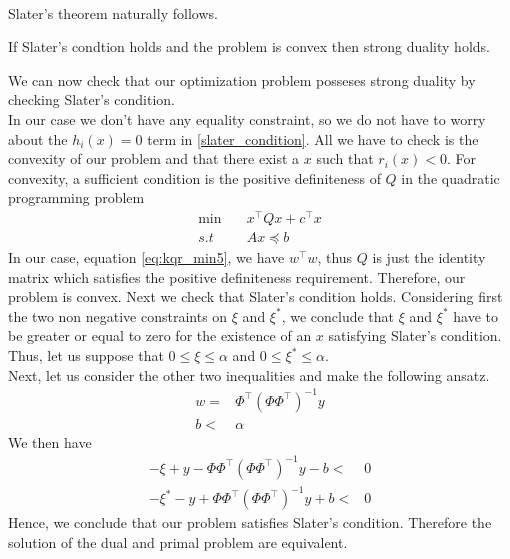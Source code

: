 \\
Slater's theorem naturally follows.
\begin{theorem}
    If Slater's condtion holds and the problem is convex then strong duality holds.
\end{theorem}
We can now check that our optimization problem posseses strong duality by checking Slater's condition.
\\
In our case we don't have any equality constraint, so we do not have to worry about the $h_i(x)=0$ term in \ref{slater_condition}. All we have to check is the convexity of our problem and that there exist a $x$ such that $r_i(x)<0$.
For convexity, a sufficient condition is the positive definiteness of $Q$ in the quadratic programming problem 
\begin{equation}
    \begin{aligned}
        \min \quad & x^\intercal Q x+ c^\intercal x \\        
        s.t \quad& Ax\preceq b
    \end{aligned}
\end{equation}
In our case, equation \ref{eq:kqr_min5}, we have $w^\intercal w$, thus $Q$ is just the identity matrix which satisfies the positive definiteness requirement. Therefore, our problem is convex.
Next we check that Slater's condition holds. Considering first the two non negative constraints on $\xi$ and $\xi^*$, we conclude that $\xi$  and $\xi^*$ have to be greater or equal to zero for the existence of an $x$ satisfying Slater's condition. Thus, let us suppose that $0 \leq \xi \leq \alpha$ and $0 \leq \xi^* \leq \alpha$.
\\
Next, let us consider the other two inequalities and make the following ansatz.
\\
\begin{equation}
    \begin{aligned}
        w=& \Phi^\intercal(\Phi \Phi^\intercal)^{-1} y\\
        b<& \alpha
    \end{aligned}
\end{equation}
We then have
\begin{equation}
    \begin{aligned}
        -\xi + y -\Phi\Phi^\intercal(\Phi \Phi^\intercal)^{-1}y-b<&0
        \\
        -\xi^* - y +\Phi\Phi^\intercal(\Phi \Phi^\intercal)^{-1}y+b<&0
    \end{aligned}
\end{equation}
Hence, we conclude that our problem satisfies Slater's condition. Therefore the solution of the dual and primal problem are equivalent.
